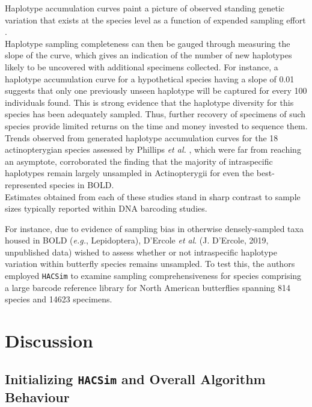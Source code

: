 Haplotype accumulation curves paint a picture of observed standing genetic variation that exists at the species level as a function of expended sampling effort \cite{phillips2019incomplete, phillips2015exploration}. \\ Haplotype sampling completeness can then be gauged through measuring the slope of the curve, which gives an indication of the number of new haplotypes likely to be uncovered with additional specimens collected. For instance, a haplotype accumulation curve for a hypothetical species having a slope of 0.01 suggests that only one previously unseen haplotype will be captured for every 100 individuals found. This is strong evidence that the haplotype diversity for this species has been adequately sampled. Thus, further recovery of specimens of such species provide limited returns on the time and money invested to sequence them. Trends observed from generated haplotype accumulation curves for the 18 actinopterygian species assessed by Phillips \textit{et al.} \cite{phillips2015exploration}, which were far from reaching an asymptote, corroborated the finding that the majority of intraspecific haplotypes remain largely unsampled in Actinopterygii for even the best-represented species in BOLD. \\ Estimates obtained from each of these studies stand in sharp contrast to sample sizes typically reported within DNA barcoding studies. 




For instance, due to evidence of sampling bias in otherwise densely-sampled taxa housed in BOLD (\textit{e.g.}, Lepidoptera), D'Ercole \textit{et al}. (J. D'Ercole, 2019, unpublished data) wished to assess whether or not intraspecific haplotype variation within butterfly species remains unsampled. To test this, the authors employed {\tt HACSim} to examine sampling comprehensiveness for species comprising a large barcode reference library for North American butterflies spanning 814 species and 14623 specimens.

\section{Discussion}

\subsection{Initializing {\tt HACSim} and Overall Algorithm Behaviour}

